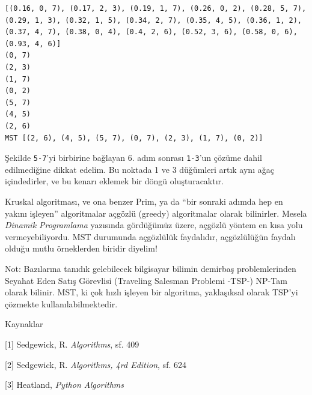 \documentclass[12pt,fleqn]{article}\usepackage{../../common}
\begin{document}
\begin{verbatim}
[(0.16, 0, 7), (0.17, 2, 3), (0.19, 1, 7), (0.26, 0, 2), (0.28, 5, 7), (0.29, 1, 3), (0.32, 1, 5), (0.34, 2, 7), (0.35, 4, 5), (0.36, 1, 2), (0.37, 4, 7), (0.38, 0, 4), (0.4, 2, 6), (0.52, 3, 6), (0.58, 0, 6), (0.93, 4, 6)]
(0, 7)
(2, 3)
(1, 7)
(0, 2)
(5, 7)
(4, 5)
(2, 6)
MST [(2, 6), (4, 5), (5, 7), (0, 7), (2, 3), (1, 7), (0, 2)]
\end{verbatim}

Şekilde \verb!5-7!'yi birbirine bağlayan 6. adım sonrası \verb!1-3!'un
çözüme dahil edilmediğine dikkat edelim. Bu noktada 1 ve 3 düğümleri artık
aynı ağaç içindedirler, ve bu kenarı eklemek bir döngü oluşturacaktır. 

Kruskal algoritması, ve ona benzer Prim, ya da ``bir sonraki adımda hep en
yakını işleyen'' algoritmalar açgözlü (greedy) algoritmalar olarak
bilinirler. Mesela {\em Dinamik Programlama} yazısında gördüğümüz üzere,
açgözlü yöntem en kısa yolu vermeyebiliyordu. MST durumunda açgözlülük
faydalıdır, açgözlülüğün faydalı olduğu mutlu örneklerden biridir diyelim! 

Not: Bazılarına tanıdık gelebilecek bilgisayar bilimin demirbaş
problemlerinden Seyahat Eden Satış Görevlisi (Traveling Salesman Problemi
-TSP-) NP-Tam olarak bilinir. MST, ki çok hızlı işleyen bir algoritma,
yaklaşıksal olarak TSP'yi çözmekte kullanılabilmektedir. 

Kaynaklar

[1] Sedgewick, R. {\em Algorithms}, sf. 409

[2] Sedgewick, R. {\em Algorithms, 4rd Edition}, sf. 624

[3] Heatland, {\em Python Algorithms}
\end{document}
